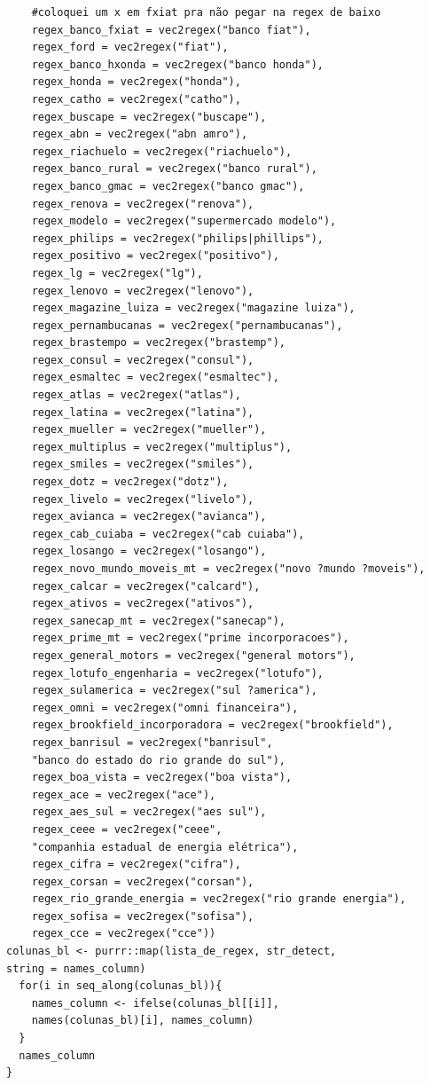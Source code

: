 \documentclass[]{report}
\begin{document}
\begin{verbatim}
    #coloquei um x em fxiat pra não pegar na regex de baixo
    regex_banco_fxiat = vec2regex("banco fiat"),
    regex_ford = vec2regex("fiat"),
    regex_banco_hxonda = vec2regex("banco honda"),
    regex_honda = vec2regex("honda"),
    regex_catho = vec2regex("catho"),
    regex_buscape = vec2regex("buscape"),
    regex_abn = vec2regex("abn amro"),
    regex_riachuelo = vec2regex("riachuelo"),
    regex_banco_rural = vec2regex("banco rural"),
    regex_banco_gmac = vec2regex("banco gmac"),
    regex_renova = vec2regex("renova"),
    regex_modelo = vec2regex("supermercado modelo"),
    regex_philips = vec2regex("philips|phillips"),
    regex_positivo = vec2regex("positivo"),
    regex_lg = vec2regex("lg"),
    regex_lenovo = vec2regex("lenovo"),
    regex_magazine_luiza = vec2regex("magazine luiza"),
    regex_pernambucanas = vec2regex("pernambucanas"),
    regex_brastempo = vec2regex("brastemp"),
    regex_consul = vec2regex("consul"),
    regex_esmaltec = vec2regex("esmaltec"),
    regex_atlas = vec2regex("atlas"),
    regex_latina = vec2regex("latina"),
    regex_mueller = vec2regex("mueller"),
    regex_multiplus = vec2regex("multiplus"),
    regex_smiles = vec2regex("smiles"),
    regex_dotz = vec2regex("dotz"),
    regex_livelo = vec2regex("livelo"),
    regex_avianca = vec2regex("avianca"),
    regex_cab_cuiaba = vec2regex("cab cuiaba"),
    regex_losango = vec2regex("losango"),
    regex_novo_mundo_moveis_mt = vec2regex("novo ?mundo ?moveis"),
    regex_calcar = vec2regex("calcard"),
    regex_ativos = vec2regex("ativos"),
    regex_sanecap_mt = vec2regex("sanecap"),
    regex_prime_mt = vec2regex("prime incorporacoes"),
    regex_general_motors = vec2regex("general motors"),
    regex_lotufo_engenharia = vec2regex("lotufo"),
    regex_sulamerica = vec2regex("sul ?america"),
    regex_omni = vec2regex("omni financeira"),
    regex_brookfield_incorporadora = vec2regex("brookfield"),
    regex_banrisul = vec2regex("banrisul",
    "banco do estado do rio grande do sul"),
    regex_boa_vista = vec2regex("boa vista"),
    regex_ace = vec2regex("ace"),
    regex_aes_sul = vec2regex("aes sul"),
    regex_ceee = vec2regex("ceee",
    "companhia estadual de energia elétrica"),
    regex_cifra = vec2regex("cifra"),
    regex_corsan = vec2regex("corsan"),
    regex_rio_grande_energia = vec2regex("rio grande energia"),
    regex_sofisa = vec2regex("sofisa"),
    regex_cce = vec2regex("cce"))
colunas_bl <- purrr::map(lista_de_regex, str_detect,
string = names_column)
  for(i in seq_along(colunas_bl)){
    names_column <- ifelse(colunas_bl[[i]],
    names(colunas_bl)[i], names_column)
  }
  names_column
}


\end{verbatim}
\end{document}
